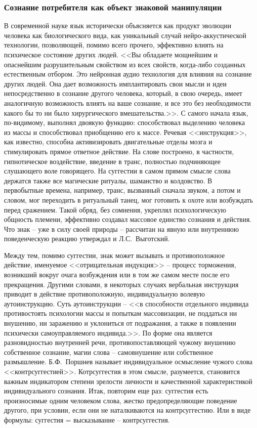 \subsubsection{Сознание потребителя как объект знаковой манипуляции}
\label{2.3}
В современной науке язык исторически объясняется как продукт эволюции
человека как биологического вида, как уникальный случай нейро-аккустической технологии,
позволяющей, помимо всего прочего, эффективно влиять на психическое состояние
других людей. <<Вы обладаете  мощнейшим и опаснейшим разрушительным свойством из всех свойств, когда-либо  созданных естественным отбором. Это нейронная аудио технология для влияния на сознание других людей. Она дает возможность имплантировать свои мысли и идеи непосредственно в сознание другого человека, который, в свою очередь, имеет аналогичную  возможность  влиять на ваше сознание, и все это без необходимости какого бы то ни было хирургического вмешательства.>>\autocite{pagel2012wired}.
С самого начала язык, по-видимому, выполнял двоякую функцию: способствовал выделению
человека из массы и способствовал приобщению его к массе. Речевая <<инструкция>>,
как известно, способна активизировать двигательные отделы мозга и стимулировать
прямое ответное действие. На слове построено, в частности, гипнотическое воздействие,
введение в транс, полностью подчиняющее слушающего воле говорящего. На суггестии
в самом прямом смысле слова держатся также все магические ритуалы, шаманство и
колдовство. В первобытные времена, например, транс, вызванный сначала звуком,
а потом и словом, мог переходить в ритуальный танец, мог готовить к охоте или
возбуждать перед сражением\autocite{porshnev1974}. Такой обряд, без сомнения,
укреплял психологическую общность племени, эффективно создавал массовое единство
сознания и действия. Что знак -- уже в силу своей природы -- рассчитан на явную или
внутреннюю поведенческую реакцию утверждал и Л.С.~Выготский\autocite[][179]{vigotsky1956}.

Между тем, помимо суггестии, знак может вызывать и противоположное действие,
именуемое <<отрицательная индукция>> -- процесс торможения, возникший вокруг очага
возбуждения или в том же самом месте после его прекращения. Другими словами,
в некоторых случаях вербальная инструкция приводит в действие противоположную,
индивидуальную волевую аутоинструкцию. Суть аутоинструкции -- <<в способности
отдельного индивида противостоять психологии массы и попыткам массовизации,
не поддаться ни внушению, ни заражению и уклониться от подражания, а также в
появлении психически самоуправляемого индивида.>>\autocite[][96]{olshansky}.
По форме она является разновидностью внутренней речи, противопоставляющей чужому
внушению собственное сознание, магии слова -- самовнушение или собственное размышление.
Б.Ф.~Поршнев называет индивидуальное осмысление чужого слова <<контрсуггестией>>\autocite{porshnev1974}.
Котрсуггестия в этом смысле, разумеется, становится важным индикатором степени
зрелости личности и качественной характеристикой индивидуального сознания.
Итак, повторим еще раз: суггестия есть произносимые одним человеком слова,
жестко предопределяющие поведение другого, при условии, если они не наталкиваются
на контрсуггестию. Или в виде формулы: суггестия = высказывание -- контрсуггестия.

